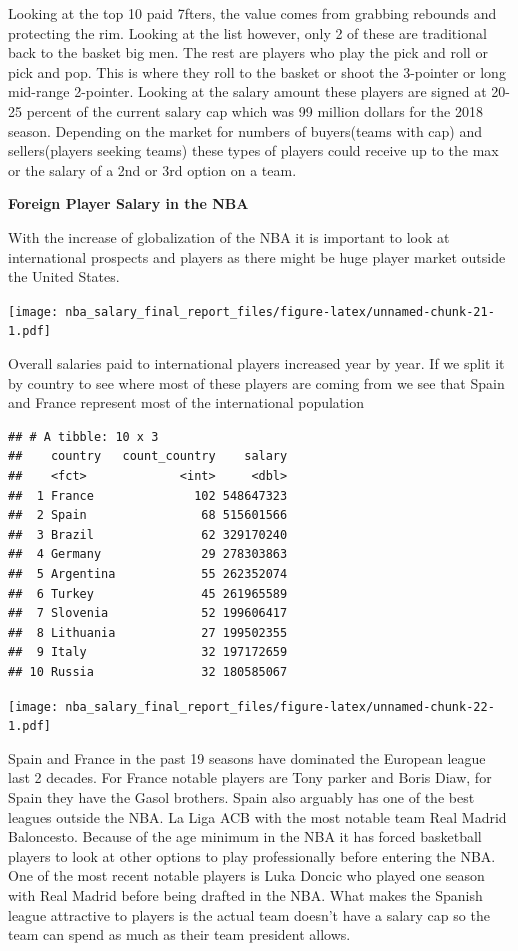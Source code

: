 \documentclass[]{article}
\begin{document}
Looking at the top 10 paid 7fters, the value comes from grabbing
rebounds and protecting the rim. Looking at the list however, only 2 of
these are traditional back to the basket big men. The rest are players
who play the pick and roll or pick and pop. This is where they roll to
the basket or shoot the 3-pointer or long mid-range 2-pointer. Looking
at the salary amount these players are signed at 20-25 percent of the
current salary cap which was 99 million dollars for the 2018 season.
Depending on the market for numbers of buyers(teams with cap) and
sellers(players seeking teams) these types of players could receive up
to the max or the salary of a 2nd or 3rd option on a team.

\textbf{Foreign Player Salary in the NBA}

With the increase of globalization of the NBA it is important to look at
international prospects and players as there might be huge player market
outside the United States.

\texttt{[image: nba\_salary\_final\_report\_files/figure-latex/unnamed-chunk-21-1.pdf]}

Overall salaries paid to international players increased year by year.
If we split it by country to see where most of these players are coming
from we see that Spain and France represent most of the international
population

\begin{verbatim}
## # A tibble: 10 x 3
##    country   count_country    salary
##    <fct>             <int>     <dbl>
##  1 France              102 548647323
##  2 Spain                68 515601566
##  3 Brazil               62 329170240
##  4 Germany              29 278303863
##  5 Argentina            55 262352074
##  6 Turkey               45 261965589
##  7 Slovenia             52 199606417
##  8 Lithuania            27 199502355
##  9 Italy                32 197172659
## 10 Russia               32 180585067
\end{verbatim}

\texttt{[image: nba\_salary\_final\_report\_files/figure-latex/unnamed-chunk-22-1.pdf]}

Spain and France in the past 19 seasons have dominated the European
league last 2 decades. For France notable players are Tony parker and
Boris Diaw, for Spain they have the Gasol brothers. Spain also arguably
has one of the best leagues outside the NBA. La Liga ACB with the most
notable team Real Madrid Baloncesto. Because of the age minimum in the
NBA it has forced basketball players to look at other options to play
professionally before entering the NBA. One of the most recent notable
players is Luka Doncic who played one season with Real Madrid before
being drafted in the NBA. What makes the Spanish league attractive to
players is the actual team doesn't have a salary cap so the team can
spend as much as their team president allows.
\end{document}
